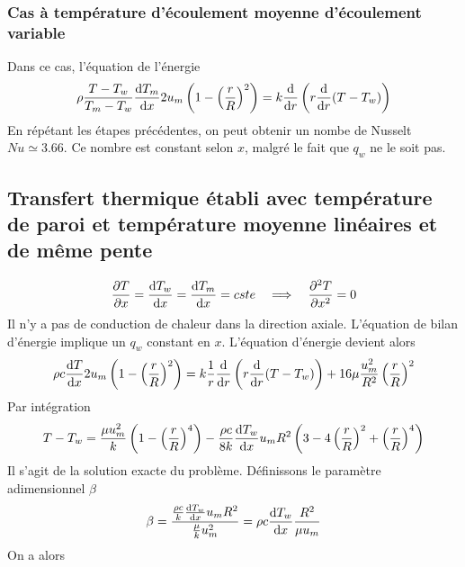       \subsubsection{Cas à température d'écoulement moyenne d'écoulement variable}
        Dans ce cas, l'équation de l'énergie
        \begin{equation}
          \rho \frac{T-T_w}{T_m - T_w}\dv{T_m}{x} 2 u_m \left(1 - \left(\frac{r}{R}\right)^2\right) = k \dv{r}\left(r \dv{r}(T-T_w)\right)
        \end{equation}
        En répétant les étapes précédentes, on peut obtenir un nombe de Nusselt $Nu \simeq 3.66$. Ce nombre est constant selon $x$, malgré le fait que $q_w$ ne le soit pas.

    \subsection{Transfert thermique établi avec température de paroi et température moyenne linéaires et de même pente}
      \begin{equation}
        \pdv{T}{x} = \dv{T_w}{x} = \dv{T_m}{x} = cste \quad \Longrightarrow \quad \pdv[2]{T}{x} = 0
      \end{equation}
      Il n'y a pas de conduction de chaleur dans la direction axiale. L'équation de bilan d'énergie implique un $q_w$ constant en $x$.
      L'équation d'énergie devient alors
      \begin{equation}
        \rho c \dv{T}{x} 2 u_m \left(1 - \left(\frac{r}{R}\right)^2\right) = k \frac{1}{r} \dv{r}\left(r \dv{r}(T - T_w)\right) + 16 \mu \frac{u_m^2}{R^2} \left(\frac{r}{R}\right)^2
      \end{equation}
      Par intégration
      \begin{equation}
        T-T_w = \frac{\mu u_m^2}{k} \left(1-\left(\frac{r}{R}\right)^4\right) - \frac{\rho c}{8k} \dv{T_w}{x} u_m R^2 \left(3-4\left(\frac{r}{R}\right)^2 + \left(\frac{r}{R}\right)^4\right)
      \end{equation}
      Il s'agit de la solution exacte du problème. Définissons le paramètre adimensionnel $\beta$
      \begin{equation}
        \beta = \frac{\frac{\rho c}{k}\dv{T_w}{x} u_m R^2}{\frac{\mu}{k}{u_m^2}} = \rho c \dv{T_w}{x}\frac{R^2}{\mu u_m}
      \end{equation}
      On a alors
